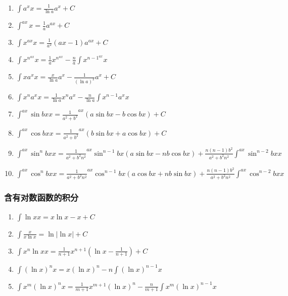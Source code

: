 \documentclass{book}
\begin{document}
\begin{enumerate}

\item $ \int a^x  x= \frac{1}{\ln a} a^x + C$

\item $ \int  ^{ax} x=\frac{1}{a}a^{ax}+C $ 

\item $ \int x   ^ {ax}  x=\frac{1}{a^2}(ax-1)a^{ax} +C $

\item $ \int x^n  ^{ax}  x=\frac{1}{a}x^n  ^{ax}-\frac{n}{a} \int x^{n-1}  ^ {ax}  x $

\item $ \int x a^x  x = \frac{x}{\ln a}a^x-\frac{1}{(\ln a)^2}a^x+C $

\item $ \int x^n a^x  x= \frac{1}{\ln a}x^n a^x-\frac{n}{\ln a}\int x^{n-1}a^x  x $

\item $ \int  ^{ax} \sin bx  x = \frac{1}{a^2+b^2} ^{ax}(a \sin bx - b \cos bx)+C $

\item $ \int  ^{ax} \cos bx  x = \frac{1}{a^2+b^2} ^{ax}(b \sin bx + a \cos bx)+C $

\item $ \int  ^{ax} \sin ^ n bx  x=\frac{1}{a^2+b^2 n^2} ^{ax} \sin ^ {n-1} bx (a \sin bx -nb \cos bx) +\frac{n(n-1)b^2}{a^2+b^2 n^2}\int  ^{ax} \sin ^{n-2} bx  x $

\item $ \int  ^{ax} \cos ^ n bx  x=\frac{1}{a^2+b^2 n^2} ^{ax} \cos ^ {n-1} bx (a \cos bx +nb \sin bx) +\frac{n(n-1)b^2}{a^2+b^2 n^2}\int  ^{ax} \cos ^{n-2} bx  x $

\end{enumerate}

\subsubsection{含有对数函数的积分}

\begin{enumerate}

\item $ \int \ln x  x = x \ln x - x + C$

\item $ \int \frac{ x}{x \ln x} =\ln \big | \ln x \big |+C $

\item $ \int x^n \ln x  x = \frac{1}{n+1}x^{n+1}(\ln x - \frac{1}{n+1} ) +C $

\item $ \int (\ln x)^{n}  x = x(\ln x)^ n - n \int (\ln x)^{n-1}  x $

\item $ \int x ^ m(\ln x)^n  x=\frac{1}{m+1}x^{m+1} (\ln x)^n - \frac{n}{m+1} \int x^m(\ln x)^{n-1} x $ 

\end{enumerate}
\end{document}

